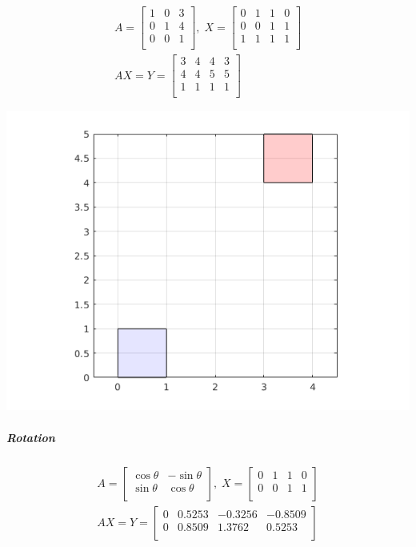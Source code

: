 \documentclass[MathsNotesBase.tex]{subfiles}
\begin{document}
{		\begin{align*}
		A =
		\begin{bmatrix}    
		1 & 0  & 3 \\
		0 & 1  & 4 \\
		0 & 0  & 1 \\		
		\end{bmatrix}
		,\; X = 
		\begin{bmatrix}  
		0   &  1  &   1  &   0 \\
		0   &  0  &   1  &   1	\\	
		1   &  1  &   1  &   1	\\	
		\end{bmatrix} \\[10pt]
		AX = Y = 
		\begin{bmatrix}   
		3  &   4  &   4  &   3 \\
		4  &   4  &   5  &   5	\\
		1   &  1  &   1  &   1	\\
		\end{bmatrix}
		\end{align*}
		
		\begin{center}
		\includegraphics[scale=0.85]{resources/img/GeometryOfMatrices_images/translation.png}
		\end{center}
		
		\subparagraph{Rotation}
		\begin{align*}
		A =
		\begin{bmatrix}    
		\cos{\theta}  &  -\sin{\theta} \\
		\sin{\theta}  &  \cos{\theta} \\		
		\end{bmatrix}
		,\; X = 
		\begin{bmatrix}  
		0   &  1  &   1  &   0 \\
		0   &  0  &   1  &   1	\\	
		\end{bmatrix} \\[10pt]
		AX = Y = 
		\begin{bmatrix}   
		0  &   0.5253  &  -0.3256  &  -0.8509 \\
		0  &   0.8509  &   1.3762  &   0.5253	\\
		\end{bmatrix}
		\end{align*}
	
}
\end{document}
